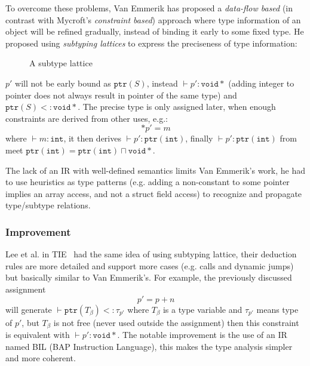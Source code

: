 \documentclass[compsoc,conference,a4paper,10pt,times]{IEEEtran}
\begin{document}
To overcome these problems, Van Emmerik has proposed a \emph{data-flow based}
(in contrast with Mycroft's \emph{constraint based}) approach where type information of an object will be refined gradually,
instead of binding it early to some fixed type. He proposed using \emph{subtyping lattices} to express the
preciseness of type information:
\begin{figure}[h]
  \centering
  \caption{A subtype lattice}
\end{figure}
$p'$ will not be early bound as $\mathtt{ptr}(S)$, instead $\vdash p' \colon \mathtt{void*}$
(adding integer to pointer does not always result in pointer of the same type) and
$\mathtt{ptr}(S) <\colon \mathtt{void*}$. The precise type
is only assigned later, when enough constraints are derived from other uses, e.g.:
\begin{equation*}
  *{p'} = m
\end{equation*}
where $\vdash m \colon \mathtt{int}$, it then derives $\vdash p' \colon \mathtt{ptr}(\mathtt{int})$,
finally $\vdash p' \colon \mathtt{ptr}(\mathtt{int})$ from meet
$\mathtt{ptr}(\mathtt{int}) = \mathtt{ptr}(\mathtt{int}) \sqcap \mathtt{void*}$.

The lack of an IR with well-defined semantics limits Van Emmerik's work, he had to use heuristics as
type patterns (e.g. adding a non-constant to some pointer implies an array access, and not a struct field
access) to recognize and propagate type/subtype relations.

\subsubsection*{Improvement}
\noindent
Lee et al. in TIE~\cite{lee_tie_2011} had the same idea of using subtyping lattice,
their deduction rules are more detailed and support more cases
(e.g. calls and dynamic jumps) but basically similar to Van Emmerik's. For example,
the previously discussed assignment
\begin{equation*}
  p' = p + n
\end{equation*}
will generate $\vdash \mathtt{ptr}(T_{\beta}) <\colon \tau_{p'}$ where $T_{\beta}$ is
a type variable and $\tau_{p'}$ means type of $p'$, but $T_{\beta}$ is not free (never used outside
the assignment) then this constraint is equivalent with $\vdash p' \colon \mathtt{void*}$. The notable
improvement is the use of an IR named BIL (BAP Instruction Language), this makes the type analysis
simpler and more coherent.
\end{document}
